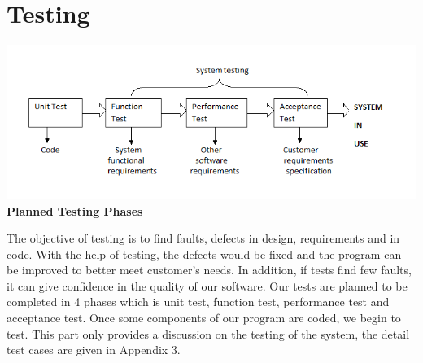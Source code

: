 \documentclass[10pt,a4paper]{article}
\begin{document}
\section{Testing}
\begin{center}
\includegraphics[scale=0.5]{9.png}\\
\textbf{Planned Testing Phases}\\
\end{center}
The objective of testing is to find faults, defects in design, requirements and in code\cite{SEP}. With the help of testing, the defects would be fixed and the program can be improved to better meet customer’s needs. In addition, if tests find few faults, it can give confidence in the quality of our software. Our tests are planned to be completed in 4 phases which is unit test, function test, performance test and acceptance test. Once some components of our program are coded, we begin to test. This part only provides a discussion on the testing of the system, the detail test cases are given in Appendix 3. 
\end{document}
